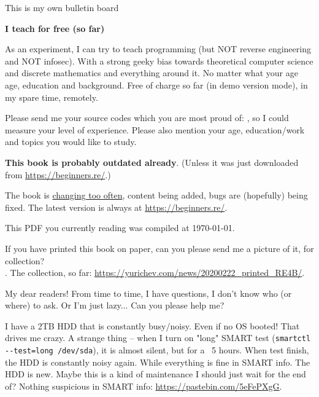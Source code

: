 
\begin{center}
\LARGE{} This is my own bulletin board \normalsize{}
\end{center}

\textbf{I teach for free (so far)}

As an experiment, I can try to teach programming (but NOT reverse engineering and NOT infosec). With a strong geeky bias towards theoretical computer science and discrete mathematics and everything around it. No matter what your age age, education and background. Free of charge so far (in demo version mode), in my spare time, remotely.

Please send me your source codes which you are most proud of: \EMAILS{},
so I could measure your level of experience. Please also mention your age, education/work and topics you would like to study.

\myhrule{}

\textbf{This book is probably outdated already}.
(Unless it was just downloaded from \url{https://beginners.re/}.)

The book is \href{\RepoURL/ChangeLog}{changing too often},
content being added, bugs are (hopefully) being fixed.
The latest version is always at \url{https://beginners.re/}.

This PDF you currently reading was compiled at \today{}.

\myhrule{}

If you have printed this book on paper, can you please send me a picture of it, for collection?\\
\EMAILS{}.
The collection, so far: \url{https://yurichev.com/news/20200222_printed_RE4B/}.

\myhrule{}

My dear readers! From time to time, I have questions, I don't know who (or where) to ask.
Or I'm just lazy...
Can you please help me?

\myhrule{}

I have a 2TB HDD that is constantly busy/noisy.
Even if no OS booted!
That drives me crazy.
A strange thing -- when I turn on "long" SMART test (\verb|smartctl --test=long /dev/sda|),
it is almost silent, but for a ~5 hours.
When test finish, the HDD is constantly noisy again.
While everything is fine in SMART info.
The HDD is new.
Maybe this is a kind of maintenance I should just wait for the end of?
Nothing suspicious in SMART info: \url{https://pastebin.com/5eFePXgG}.

